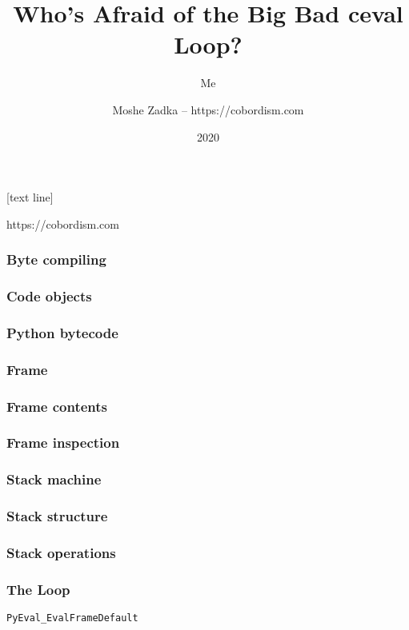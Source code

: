 \usepackage{hyperref}
\usepackage{graphicx}
\usepackage{listings}
\usepackage{textcomp}
\usepackage{fancyvrb}

[text line]{%
  \parbox{\linewidth}{\vspace*{-64pt}https://cobordism.com}}

\title{Who's Afraid of the Big Bad ceval Loop?}
\subtitle{Me}
\author{Moshe Zadka -- https://cobordism.com}
\date{2020}


\begin{titlepage}
\maketitle
\end{titlepage}

\frame{\titlepage}

\begin{frame}
\frametitle{Byte compiling}
\end{frame}

\begin{frame}
\frametitle{Code objects}
\end{frame}

\begin{frame}
\frametitle{Python bytecode}
\end{frame}

\begin{frame}
\frametitle{Frame}
\end{frame}

\begin{frame}
\frametitle{Frame contents}
\end{frame}

\begin{frame}
\frametitle{Frame inspection}
\end{frame}

\begin{frame}
\frametitle{Stack machine}
\end{frame}

\begin{frame}
\frametitle{Stack structure}
\end{frame}

\begin{frame}
\frametitle{Stack operations}
\end{frame}

\begin{frame}
\frametitle{The Loop}
\verb|PyEval_EvalFrameDefault|
\end{frame}

